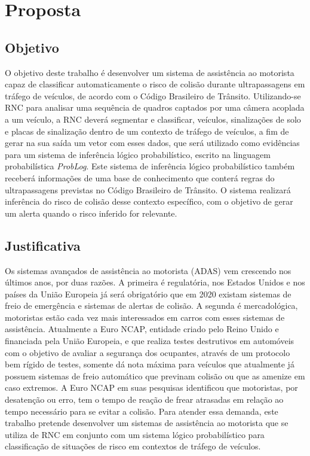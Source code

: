 \documentclass[
	12pt,				%
    oneside,			%
	a4paper,			%
	english,			%
	french,				%
	spanish,			%
	brazil,				%
	]{abntex2}
\begin{document}








\chapter {Proposta}

\section {Objetivo}
O objetivo deste trabalho é desenvolver um sistema de assistência ao motorista capaz de classificar automaticamente o risco de colisão durante ultrapassagens em tráfego de veículos, de acordo com o Código Brasileiro de Trânsito. Utilizando-se RNC para analisar uma sequência de quadros captados por uma câmera acoplada a um veículo, a RNC deverá segmentar e classificar, veículos, sinalizações de solo e placas de sinalização dentro de um contexto de tráfego de veículos, a fim de gerar na sua saída um vetor com esses dados, que será utilizado como evidências para um sistema de inferência lógico probabilístico, escrito na linguagem probabilística \textit{ProbLog}. Este sistema de inferência lógico probabilístico também receberá informações de uma base de conhecimento que conterá regras do ultrapassagens previstas no Código Brasileiro de Trânsito. O sistema realizará inferência do risco de colisão desse contexto específico, com o objetivo de gerar um alerta quando o risco inferido for relevante.

\section {Justificativa}
Os sistemas avançados de assistência ao motorista (ADAS) vem crescendo nos últimos anos, por duas razões. A primeira é regulatória, nos Estados Unidos e nos países da União Europeia já será obrigatório que em 2020 existam sistemas  de freio de emergência e sistemas de alertas de colisão. A segunda é mercadológica, motoristas estão cada vez mais interessados em carros com esses sistemas de assistência. Atualmente a Euro NCAP, entidade criado pelo Reino Unido e financiada pela União Europeia, e que realiza testes destrutivos em automóveis com o objetivo de avaliar a segurança dos ocupantes, através de um protocolo bem rígido de testes, somente dá nota máxima para veículos que atualmente já possuem sistemas de freio automático que previnam colisão ou que as amenize em caso extremos. A Euro NCAP em suas pesquisas identificou que motoristas, por desatenção ou erro, tem o tempo de reação de frear atrasadas em relação ao tempo necessário para se evitar a colisão. Para atender essa demanda, este trabalho pretende desenvolver um sistemas de assistência ao motorista que se utiliza de RNC em conjunto com um sistema lógico probabilístico para classificação de situações de risco em contextos de tráfego de veículos.
\end{document}
